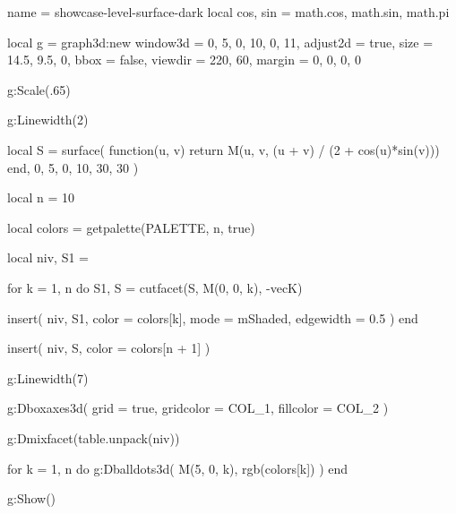 
\vfill

\begin{luadraw}{name = showcase-level-surface-dark}
local cos, sin = math.cos, math.sin, math.pi

local g = graph3d:new{
  window3d = {0, 5, 0, 10, 0, 11},
  adjust2d = true,
  size     = {14.5, 9.5, 0},
  bbox     = false,
  viewdir  = {220, 60},
  margin   = {0, 0, 0, 0}
}

g:Scale(.65)

g:Linewidth(2)

local S = surface(
  function(u, v)
    return M(u, v, (u + v) / (2 + cos(u)*sin(v)))
  end,
  0, 5, 0, 10,
  {30, 30}
)

local n = 10

local colors = getpalette(PALETTE, n, true)

local niv, S1 = {}

for k = 1, n do
  S1, S = cutfacet(S, {M(0, 0, k), -vecK})

  insert(
    niv,
    {
      S1,
      {
        color     = colors[k],
        mode      = mShaded,
        edgewidth = 0.5
      }
    }
  )
end

insert(
  niv,
  {
    S,
    {color = colors[n + 1]}
  }
)

g:Linewidth(7)

g:Dboxaxes3d({
  grid      = true,
  gridcolor = COL_1,
  fillcolor = COL_2
})

g:Dmixfacet(table.unpack(niv))

for k = 1, n do
  g:Dballdots3d(
    M(5, 0, k),
    rgb(colors[k])
  )
end

g:Show()
\end{luadraw}



\newpage

